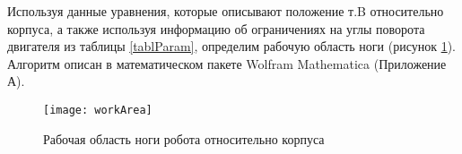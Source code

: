 Используя данные уравнения, которые описывают положение т.B относительно корпуса, а также используя информацию об ограничениях на углы поворота двигателя из таблицы \ref{tablParam}, определим рабочую область ноги (рисунок \ref{workArea}). Алгоритм описан в математическом пакете Wolfram Mathematica (Приложение А). %
\newpage
\begin{figure}[h!]
	\begin{center}
		\texttt{[image: workArea]}
		\caption{Рабочая область ноги робота относительно корпуса}
		\label{workArea}
	\end{center}
\end{figure}

